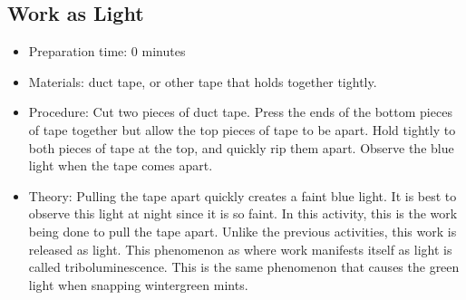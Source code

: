 \subsection{Work as Light}
\begin{itemize}
\item{Preparation time: 0 minutes}
\item{Materials: duct tape, or other tape that holds together tightly.}
\item{Procedure: Cut two pieces of duct tape. Press the ends of the bottom pieces of tape together but allow the top pieces of tape to be apart. Hold tightly to both pieces of tape at the top, and quickly rip them apart. Observe the blue light when the tape comes apart.}
\item{Theory: Pulling the tape apart quickly creates a faint blue light. It is best to observe this light at night since it is so faint. In this activity, this is the work being done to pull the tape apart. Unlike the previous activities, this work is released as light. This phenomenon as where work manifests itself as light is called triboluminescence. This is the same phenomenon that causes the green light when snapping wintergreen mints.}
\end{itemize}



	
	
	
	


